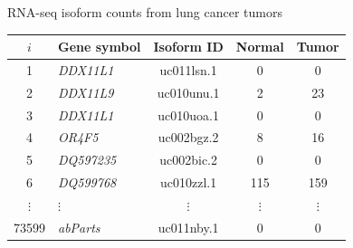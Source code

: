 \documentclass[ignorenonframetext,aspectratio=169,]{beamer}
\begin{document}
\begin{frame}{%
\protect\hypertarget{rna-seq-isoform-counts-from-lung-cancer-tumors}{%
RNA-seq isoform counts from lung cancer tumors}}

\begin{table}
\label{tab:TNBCdata}
\begin{tabular}{c|l|ccc}
\hline
$i$ & Gene symbol & Isoform ID & Normal & Tumor \\
\hline
1 &  \emph{DDX11L1}   & uc011lsn.1  & 0   & 0 \\
2 &  \emph{DDX11L9}     & uc010unu.1  & 2   & 23 \\
3 &  \emph{DDX11L1}    & uc010uoa.1  & 0   & 0 \\
4 &  \emph{OR4F5}   & uc002bgz.2  & 8   & 16 \\
5 &  \emph{DQ597235}     & uc002bic.2  & 0   & 0 \\
6 &  \emph{DQ599768}    & uc010zzl.1  & 115 &   159 \\
$\vdots$ &   $\vdots$       & $\vdots$ & $\vdots$ & $\vdots$  \\
73599 &  \emph{abParts}  & uc011nby.1  & 0   & 0  \\
\hline
\end{tabular}
\end{table}
\addtocounter{footnote}{1}

\end{frame}
\end{document}

